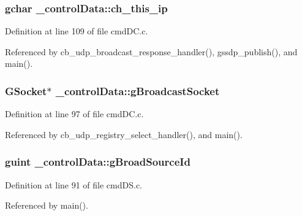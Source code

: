 \subsubsection[{\texorpdfstring{ch\+\_\+this\+\_\+ip}{ch_this_ip}}]{\setlength{\rightskip}{0pt plus 5cm}gchar \+\_\+control\+Data\+::ch\+\_\+this\+\_\+ip}\hypertarget{struct__control_data_ac48fc4263dd4a6bad484b93fbf1ffe1b}{}\label{struct__control_data_ac48fc4263dd4a6bad484b93fbf1ffe1b}


Definition at line 109 of file cmd\+D\+C.\+c.



Referenced by cb\+\_\+udp\+\_\+broadcast\+\_\+response\+\_\+handler(), gssdp\+\_\+publish(), and main().

\subsubsection[{\texorpdfstring{g\+Broadcast\+Socket}{gBroadcastSocket}}]{\setlength{\rightskip}{0pt plus 5cm}G\+Socket$\ast$ \+\_\+control\+Data\+::g\+Broadcast\+Socket}\hypertarget{struct__control_data_a05fab30fce92ebe541d9dd98220c60ef}{}\label{struct__control_data_a05fab30fce92ebe541d9dd98220c60ef}


Definition at line 97 of file cmd\+D\+C.\+c.



Referenced by cb\+\_\+udp\+\_\+registry\+\_\+select\+\_\+handler(), and main().

\subsubsection[{\texorpdfstring{g\+Broad\+Source\+Id}{gBroadSourceId}}]{\setlength{\rightskip}{0pt plus 5cm}guint \+\_\+control\+Data\+::g\+Broad\+Source\+Id}\hypertarget{struct__control_data_ae9e5e76959a76812d94ee8f83ae2eef5}{}\label{struct__control_data_ae9e5e76959a76812d94ee8f83ae2eef5}


Definition at line 91 of file cmd\+D\+S.\+c.



Referenced by main().

